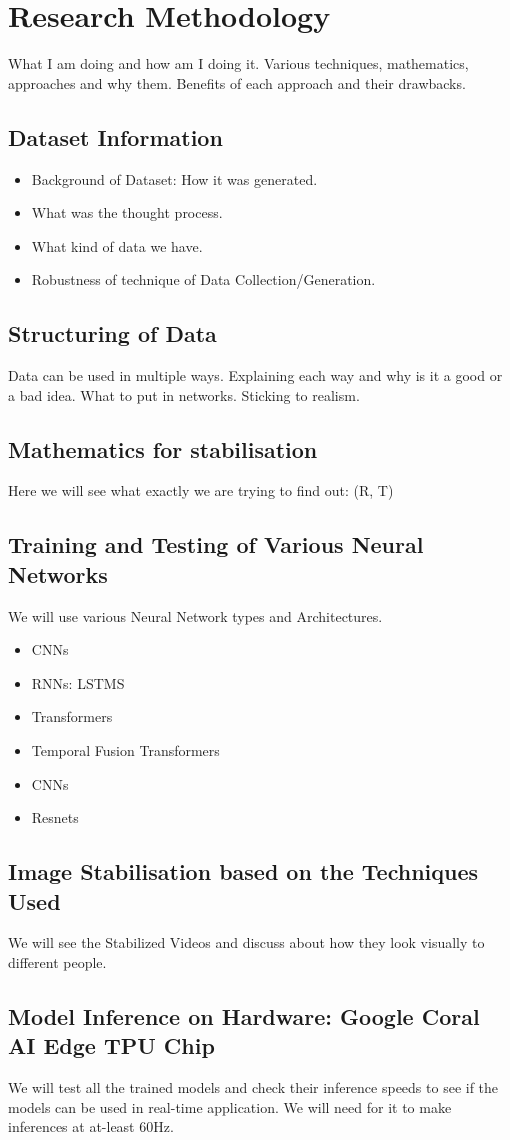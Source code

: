 \chapter{Research Methodology} \label{chapter_three}

What I am doing and how am I doing it. Various techniques, mathematics, approaches and why them. Benefits of each approach and their drawbacks.

\section{Dataset Information}
\begin{itemize}
\item Background of Dataset: How it was generated. 
\item What was the thought process. 
\item What kind of data we have.
\item Robustness of technique of Data Collection/Generation.
\end{itemize}
\section{Structuring of Data}
Data can be used in multiple ways. Explaining each way and why is it a good or a bad idea. What to put in networks. Sticking to realism.

\section{Mathematics for stabilisation}
Here we will see what exactly we are trying to find out: (R, T)

\section{Training and Testing of Various Neural Networks}
We will use various Neural Network types and Architectures.

\begin{itemize}
\item CNNs
\item RNNs: LSTMS 
\item Transformers
\item Temporal Fusion Transformers
\item CNNs
\item Resnets
\end{itemize}

\section{Image Stabilisation based on the Techniques Used}
We will see the Stabilized Videos and discuss about how they look visually to different people.

\section{Model Inference on Hardware: Google Coral AI Edge TPU Chip}
We will test all the trained models and check their inference speeds to see if the models can be used in real-time application. We will need for it to make inferences at at-least 60Hz.


